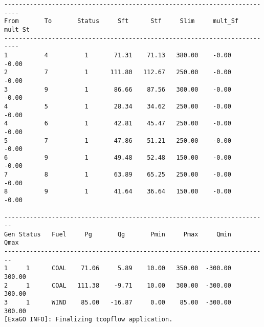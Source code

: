 \begin{lstlisting}
--------------------------------------------------------------------------
From       To       Status     Sft      Stf     Slim     mult_Sf  mult_St
--------------------------------------------------------------------------
1          4          1       71.31    71.13   380.00    -0.00    -0.00
2          7          1      111.80   112.67   250.00    -0.00    -0.00
3          9          1       86.66    87.56   300.00    -0.00    -0.00
4          5          1       28.34    34.62   250.00    -0.00    -0.00
4          6          1       42.81    45.47   250.00    -0.00    -0.00
5          7          1       47.86    51.21   250.00    -0.00    -0.00
6          9          1       49.48    52.48   150.00    -0.00    -0.00
7          8          1       63.89    65.25   250.00    -0.00    -0.00
8          9          1       41.64    36.64   150.00    -0.00    -0.00

------------------------------------------------------------------------
Gen Status   Fuel     Pg       Qg       Pmin     Pmax     Qmin     Qmax
------------------------------------------------------------------------
1     1      COAL    71.06     5.89    10.00   350.00  -300.00   300.00
2     1      COAL   111.38    -9.71    10.00   300.00  -300.00   300.00
3     1      WIND    85.00   -16.87     0.00    85.00  -300.00   300.00
[ExaGO INFO]: Finalizing tcopflow application.
\end{lstlisting}

